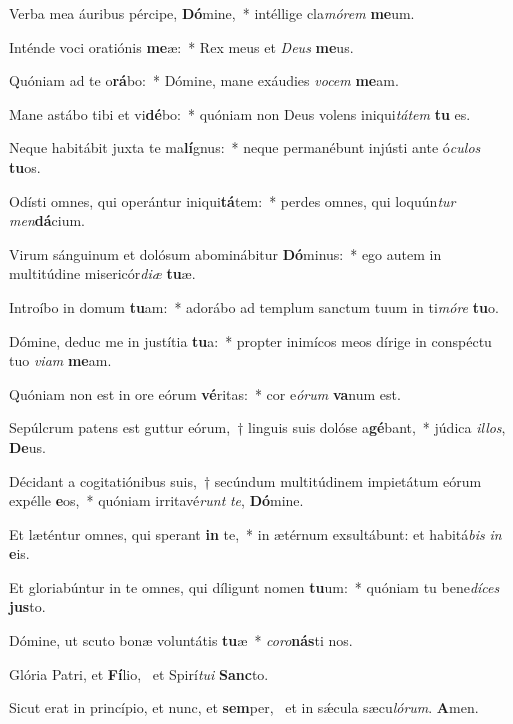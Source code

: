 \item Verba mea áuribus pércipe, \textbf{Dó}mine,~* intéllige cla\textit{mó}\textit{rem} \textbf{me}um.
\item Inténde voci oratiónis \textbf{me}æ:~* Rex meus et \textit{De}\textit{us} \textbf{me}us.
\item Quóniam ad te o\textbf{rá}bo:~* Dómine, mane exáudies \textit{vo}\textit{cem} \textbf{me}am.
\item Mane astábo tibi et vi\textbf{dé}bo:~* quóniam non Deus volens iniqui\textit{tá}\textit{tem} \textbf{tu} es.
\item Neque habitábit juxta te ma\textbf{lí}gnus:~* neque permanébunt injústi ante ó\textit{cu}\textit{los} \textbf{tu}os.
\item Odísti omnes, qui operántur iniqui\textbf{tá}tem:~* perdes omnes, qui loquún\textit{tur} \textit{men}\textbf{dá}cium.
\item Virum sánguinum et dolósum abominábitur \textbf{Dó}minus:~* ego autem in multitúdine misericór\textit{di}\textit{æ} \textbf{tu}æ.
\item Introíbo in domum \textbf{tu}am:~* adorábo ad templum sanctum tuum in ti\textit{mó}\textit{re} \textbf{tu}o.
\item Dómine, deduc me in justítia \textbf{tu}a:~* propter inimícos meos dírige in conspéctu tuo \textit{vi}\textit{am} \textbf{me}am.
\item Quóniam non est in ore eórum \textbf{vé}ritas:~* cor e\textit{ó}\textit{rum} \textbf{va}num est.
\item Sepúlcrum patens est guttur eórum,~† linguis suis dolóse a\textbf{gé}bant,~* júdica \textit{il}\textit{los}, \textbf{De}us.
\item Décidant a cogitatiónibus suis,~† secúndum multitúdinem impietátum eórum expélle \textbf{e}os,~* quóniam irritavé\textit{runt} \textit{te}, \textbf{Dó}mine.
\item Et læténtur omnes, qui sperant \textbf{in} te,~* in ætérnum exsultábunt: et habitá\textit{bis} \textit{in} \textbf{e}is.
\item Et gloriabúntur in te omnes, qui díligunt nomen \textbf{tu}um:~* quóniam tu bene\textit{dí}\textit{ces} \textbf{jus}to.
\item Dómine, ut scuto bonæ voluntátis \textbf{tu}æ~* \textit{co}\textit{ro}\textbf{nás}ti nos.
\item Glória Patri, et \textbf{Fí}lio,~\psstar{} et Spirí\textit{tu}\textit{i} \textbf{Sanc}to.
\item Sicut erat in princípio, et nunc, et \textbf{sem}per,~\psstar{} et in sǽcula sæcu\textit{ló}\textit{rum}. \textbf{A}men.
